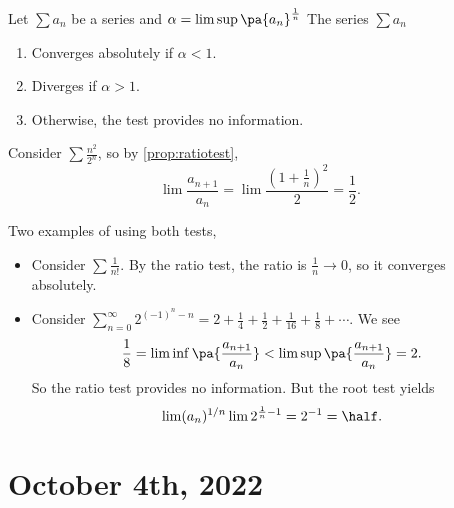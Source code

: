 \documentclass[11pt]{scrartcl}
\numberwithin{equation}{section}
\begin{document}
\begin{proposition}
    \label{prop:roottest}
    Let $\sum a_n$ be a series and $\alpha =\limsup \pa{a_n}^{\frac{1}{n}}$
    The series $\sum a_n$ 
    \begin{enumerate}
        \item Converges absolutely if $\alpha<1$.
        \item Diverges if $\alpha>1$.
        \item Otherwise, the test provides no information.
    \end{enumerate}
\end{proposition}
\begin{example}
    Consider $\sum \frac{n^2}{2^n}$, so by \cref{prop:ratiotest},
    \[ \lim\frac{a_{n+1}}{a_n} = \lim\frac{\left(1+\frac{1}{n}\right)^2}{2} = \frac{1}{2}.\]
\end{example}

\begin{example}
    Two examples of using both tests,
    \begin{itemize}
        \item Consider $\sum\frac{1}{n!}$. 
        By the ratio test, the ratio is $\frac{1}{n} \rightarrow 0$, so it converges absolutely.
        \item Consider $\sum_{n=0}^{\infty}2^{(-1)^n-n} = 2 + \frac{1}{4}+\frac{1}{2}+\frac{1}{16}+ \frac{1}{8}+\cdots$.
        We see 
        \[ \frac{1}{8} = \liminf \pa{\frac{a_{n+1}}{a_n}} <  \limsup \pa{\frac{a_{n+1}}{a_n}}= 2.\]
        So the ratio test provides no information.
        But the root test yields
        \[\lim(a_n)^{1/n} \lim 2^{\frac{1}{n} - 1}= 2^{-1} = \half. \]
    \end{itemize}
\end{example}
\clearpage
\section{October 4th, 2022}
\end{document}
